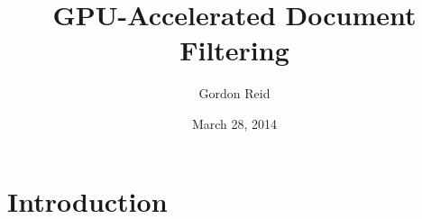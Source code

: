 \documentclass{l4proj}
\begin{document}
\title{GPU-Accelerated Document Filtering}
\author{Gordon Reid}
\date{March 28, 2014}
\maketitle

\begin{abstract}

\end{abstract}

\educationalconsent

\tableofcontents

\chapter{Introduction}


\begin{appendices}

\end{appendices}



\end{document}
